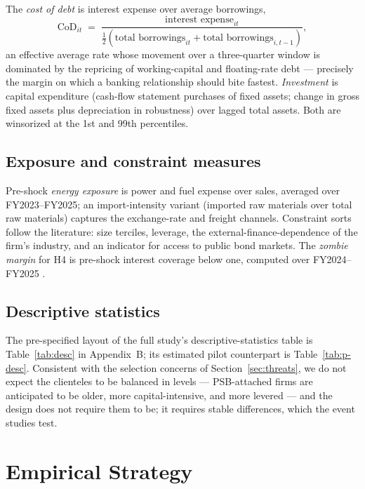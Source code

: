 \documentclass[12pt]{article}
\begin{document}
The \emph{cost of debt} is interest expense over average borrowings,
\begin{equation}
\text{CoD}_{it} \;=\; \frac{\text{interest expense}_{it}}
{\tfrac{1}{2}\left(\text{total borrowings}_{it}+\text{total borrowings}_{i,t-1}\right)},
\label{eq:cod}
\end{equation}
an effective average rate whose movement over a three-quarter window is dominated by the
repricing of working-capital and floating-rate debt --- precisely the margin on which a
banking relationship should bite fastest. \emph{Investment} is capital expenditure (cash-flow
statement purchases of fixed assets; change in gross fixed assets plus depreciation in
robustness) over lagged total assets. Both are winsorized at the 1st and 99th percentiles.

\subsection{Exposure and constraint measures}

Pre-shock \emph{energy exposure} is power and fuel expense over sales, averaged over
FY2023--FY2025; an import-intensity variant (imported raw materials over total raw
materials) captures the exchange-rate and freight channels. Constraint sorts follow the
literature: size terciles, leverage, the \citet{rajan1998} external-finance-dependence
of the firm's industry, and an indicator for access to public bond markets. The
\emph{zombie margin} for H4 is pre-shock interest coverage below one, computed over
FY2024--FY2025 \citep{caballero2008}.

\subsection{Descriptive statistics}

The pre-specified layout of the full study's descriptive-statistics table is
Table~\ref{tab:desc} in Appendix~B; its estimated pilot counterpart is
Table~\ref{tab:p-desc}. Consistent with the selection concerns of
Section~\ref{sec:threats}, we do not expect the clienteles to be balanced in levels ---
PSB-attached firms are anticipated to be older, more capital-intensive, and more levered
--- and the design does not require them to be; it requires stable differences, which the
event studies test.

\section{Empirical Strategy}\label{sec:strategy}
\end{document}
